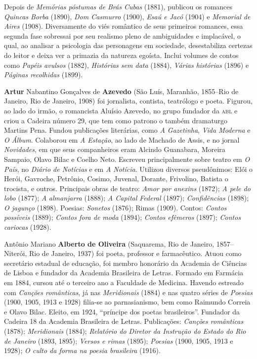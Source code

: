 Depois de \emph{Memórias póstumas de Brás Cubas} (1881), publicou os
romances \emph{Quincas Borba} (1890), \emph{Dom Casmurro} (1900),
\emph{Esaú e Jacó} (1904) e \emph{Memorial de Aires} (1908).
Diversamente do viés romântico de seus primeiros romances, essa segunda
fase sobressai por seu realismo pleno de ambiguidades e implacável, o
qual, ao analisar a psicologia das personagens em sociedade,
desestabiliza certezas do leitor e deixa ver a primazia da natureza
egoísta. Inclui volumes de contos como \emph{Papéis avulsos} (1882),
\emph{Histórias sem data} (1884), \emph{Várias histórias} (1896) e
\emph{Páginas recolhidas} (1899).


\textbf{Artur} Nabantino Gonçalves de \textbf{Azevedo} (São Luís,
Maranhão, 1855--Rio de Janeiro, Rio de Janeiro, 1908) foi jornalista,
contista, teatrólogo e poeta. Figurou, ao lado do irmão, o romancista
Aluísio Azevedo, no grupo fundador da \textsc{abl} e criou a Cadeira número 29,
que tem como patrono o também dramaturgo Martins Pena. Fundou
publicações literárias, como \emph{A Gazetinha}, \emph{Vida Moderna} e
\emph{O Álbum}. Colaborou em \emph{A Estação}, ao lado de Machado de
Assis, e no jornal \emph{Novidades}, em que seus companheiros eram
Alcindo Guanabara, Moreira Sampaio, Olavo Bilac e Coelho Neto. Escreveu
principalmente sobre teatro em \emph{O País}, no \emph{Diário de
Notícias} e em \emph{A Notícia}. Utilizou diversos pseudônimos: Elói o
Herói, Gavroche, Petrônio, Cosimo, Juvenal, Dorante, Frivolino, Batista
o trocista, e outros. Principais obras de teatro: \emph{Amor por
anexins} (1872); \emph{A pele do lobo} (1877); \emph{A}
\emph{almanjarra} (1888); \emph{A Capital Federal} (1897);
\emph{Confidências} (1898); \emph{O jagunço} (1898). Poesias:
\emph{Sonetos} (1876); Rimas (1909). Contos: \emph{Contos possíveis}
(1889); \emph{Contos fora de moda} (1894); \emph{Contos efêmeros}
(1897); \emph{Contos cariocas} (1928).


Antônio Mariano \textbf{Alberto de Oliveira}
(Saquarema, Rio de Janeiro, 1857--Niterói, Rio de Janeiro,
1937) foi poeta, professor e farmacêutico. Atuou como secretário
estadual de educação, foi membro honorário da Academia de Ciências de
Lisboa e fundador da Academia Brasileira de Letras. Formado em Farmácia
em 1884, cursou até o terceiro ano a Faculdade de Medicina. Havendo
estreado com \emph{Canções românticas}, já nas \emph{Meridionais} (1884)
e nas quatro séries de \emph{Poesias} (1900, 1905, 1913 e 1928) filia-se
ao parnasianismo, bem como Raimundo Correia e Olavo Bilac. Eleito, em
1924, ``príncipe dos poetas brasileiros''. Fundador da Cadeira 18 da
Academia Brasileira de Letras. Publicações: \emph{Canções românticas}
(1878); \emph{Meridionais} (1884); \emph{Relatório do Diretor da
Instrução do Estado do Rio de Janeiro} (1893, 1895); \emph{Versos e
rimas} (1895); \emph{Poesias} (1900, 1905, 1913 e 1928); \emph{O culto
da forma na poesia brasileira} (1916).

